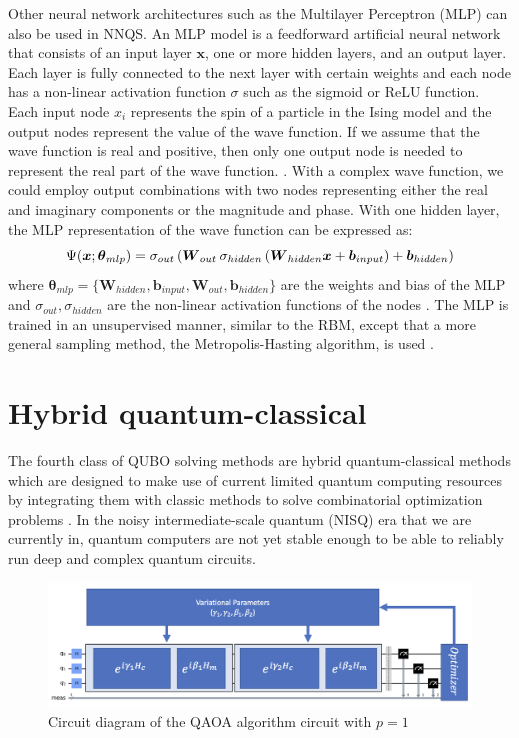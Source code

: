 Other neural network architectures such as the Multilayer Perceptron (MLP) can also be used in NNQS. An MLP model is a feedforward artificial neural network that consists of an input layer $\boldsymbol{x}$, one or more hidden layers, and an output layer. Each layer is fully connected to the next layer with certain weights and each node has a non-linear activation function $\sigma$ such as the sigmoid or ReLU function. Each input node $x_i$ represents the spin of a particle in the Ising model and the output nodes represent the value of the wave function. If we assume that the wave function is real and positive, then only one output node is needed to represent the real part of the wave function. \cite{b20}. With a complex wave function, we could employ output combinations with two nodes representing either the real and imaginary components or the magnitude and phase. With one hidden layer, the MLP representation of the wave function can be expressed as:
\begin{equation}
    \Psi(\boldsymbol{x}; \boldsymbol{\theta}_{mlp}) = 
    \sigma_{out} \left(
    \boldsymbol{W}_{out} \hspace{2px}
    \sigma_{hidden} \left( \boldsymbol{W}_{hidden}\boldsymbol{x} + \boldsymbol{b}_{input} \right) + \boldsymbol{b}_{hidden} \right)
\end{equation}
where  $\boldsymbol{\theta}_{mlp} = \{\boldsymbol{W}_{hidden}, \boldsymbol{b}_{input}, \boldsymbol{W}_{out}, \boldsymbol{b}_{hidden}\}$ are the weights and bias of the MLP and $\sigma_{out}, \sigma_{hidden}$ are the non-linear activation functions of the nodes \cite{b20}. The MLP is trained in an unsupervised manner, similar to the RBM, except that a more general sampling method, the Metropolis-Hasting algorithm, is used \cite{b25}.

\section{Hybrid quantum-classical}
The fourth class of QUBO solving methods are hybrid quantum-classical methods which are designed to make use of current limited quantum computing resources by integrating them with classic methods to solve combinatorial optimization problems \cite{b32}. In the noisy intermediate-scale quantum (NISQ) era that we are currently in, quantum computers are not yet stable enough to be able to reliably run deep and complex quantum circuits. 

\begin{figure}[h!]
    \centering
    \includegraphics[width=\linewidth]{images/qaoa_circuit.png}
    \caption{Circuit diagram of the QAOA algorithm circuit with $p=1$}
    \label{qaoacircuit}
\end{figure}

